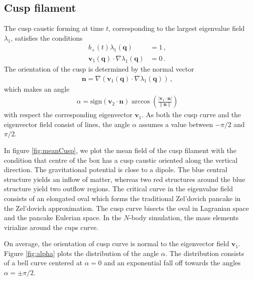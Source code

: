 \documentclass[a4paper, 11pt]{article}
\begin{document}
\subsection{Cusp filament}
The cusp caustic forming at time $t$, corresponding to the largest eigenvalue field $\lambda_1$, satisfies the conditions
\begin{align}
b_+(t) \lambda_1(\bm{q}) &= 1\,, \\
 \bm{v}_1(\bm{q}) \cdot \nabla\lambda_1(\bm{q}) &= 0\,.
\end{align}
The orientation of the cusp is determined by the normal vector
\begin{align}
\bm{n} =  \nabla(\bm{v}_1(\bm{q}) \cdot \nabla\lambda_1(\bm{q}))\,,
\end{align}
which makes an angle 
\begin{align}
\alpha = \text{sign}(\bm{v}_2\cdot \bm{n}) \arccos\left(\frac{|\bm{v}_1\cdot \bm{n}|}{\|\bm{n}\|}\right)
\end{align}
with respect the corresponding eigenvector $\bm{v}_1$. As both the cusp curve and the eigenvector field consist of lines, the angle $\alpha$ assumes a value between $-\pi/2$ and $\pi/2$. 

In figure \ref{fig:meanCusp}, we plot the mean field of the cusp filament with the condition that centre of the box has a cusp caustic oriented along the vertical direction. The gravitational potential is close to a dipole. The blue central structure yields an inflow of matter, whereas two red structures around the blue structure yield two outflow regions. The critical curve in the eigenvalue field consists of an elongated oval which forms the traditional Zel'dovich pancake in the Zel'dovich approximation. The cusp curve bisects the oval in Lagranian space and the pancake Eulerian space. In the $N$-body simulation, the mass elements virialize around the cups curve.

On average, the orientation of cusp curve is normal to the eigenvector field $\bm{v}_1$. Figure \ref{fig:alpha} plots the distribution  of the angle $\alpha$. The distribution consists of a bell curve centered at $\alpha =0$ and an exponential fall off towards the angles $\alpha =\pm \pi/2$.
\end{document}
